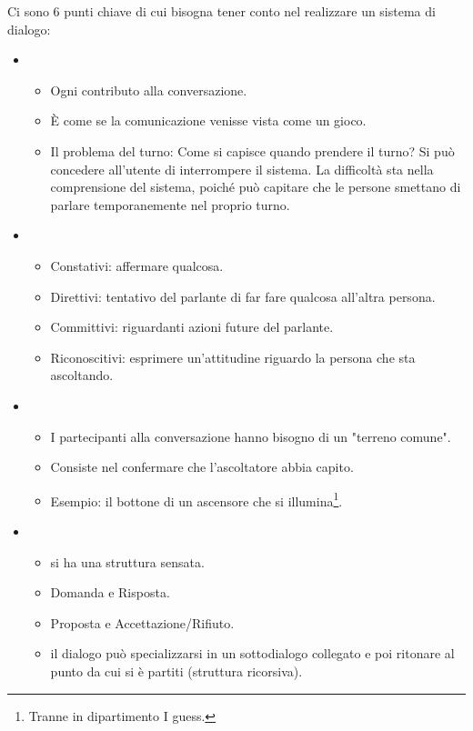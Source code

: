 Ci sono 6 punti chiave di cui bisogna tener conto nel realizzare un sistema di dialogo:

\begin{itemize}
  \item {} 
    \begin{itemize}
      \item Ogni contributo alla conversazione. 
      \item È come se la comunicazione venisse vista come un gioco.  
      \item Il problema del turno: Come si capisce quando prendere il turno? Si può concedere all'utente di interrompere il sistema. La difficoltà sta nella comprensione del sistema, poiché può capitare che le persone smettano di parlare temporanemente nel proprio turno.
    \end{itemize}
  \item {}
    \begin{itemize}
      \item Constativi: affermare qualcosa.
      \item Direttivi: tentativo del parlante di far fare qualcosa all'altra persona.
      \item Committivi: riguardanti azioni future del parlante.
      \item Riconoscitivi: esprimere un'attitudine riguardo la persona che sta ascoltando.
    \end{itemize}
  \item {}
    \begin{itemize}
      \item I partecipanti alla conversazione hanno bisogno di un "terreno comune". 
      \item Consiste nel confermare che l'ascoltatore abbia capito. 
      \item Esempio: il bottone di un ascensore che si illumina\footnote{Tranne in dipartimento I guess.}.
    \end{itemize}
  \item {}
    \begin{itemize}
      \item {} si ha una struttura sensata. 
      \item Domanda e Risposta. 
      \item Proposta e Accettazione/Rifiuto.
    \item {} il dialogo può specializzarsi in un sottodialogo collegato e poi ritonare al punto da cui si è partiti (struttura ricorsiva). 

\end{itemize}
\end{itemize}
